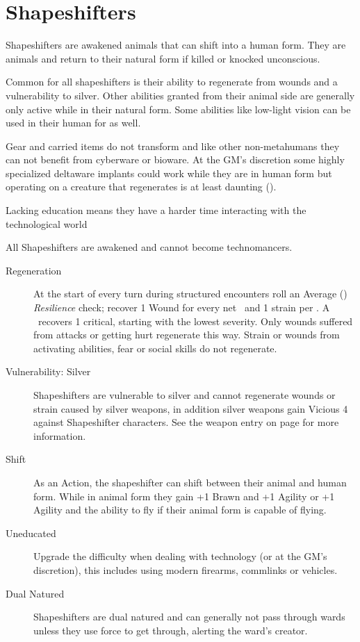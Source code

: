 \documentclass{book}
\begin{document}
\section{Shapeshifters}
\label{sec:shapeshifters}
\begin{multicols}{2}
Shapeshifters are awakened animals that can shift into a human form. They are animals and return to their natural form if killed or knocked unconscious. 

Common for all shapeshifters is their ability to regenerate from wounds and a vulnerability to silver. Other abilities granted from their animal side are generally only active while in their natural form. Some abilities like low-light vision can be used in their human for as well.

Gear and carried items do not transform and like other non-metahumans they can not benefit from cyberware or bioware. At the GM's discretion some highly specialized deltaware implants could work while they are in human form but operating on a creature that regenerates is at least daunting (\DifficultyDie \DifficultyDie \DifficultyDie \DifficultyDie).

Lacking education means they have a harder time interacting with the technological world

All Shapeshifters are awakened and cannot become technomancers.


\begin{description}
	\item[Regeneration] At the start of every turn during structured encounters roll an Average (\DifficultyDie \DifficultyDie) \emph{Resilience} check; recover 1 Wound for every net \Success\ and 1 strain per \Advantage. A \Triumph\ recovers 1 critical, starting with the lowest severity. Only wounds suffered from attacks or getting hurt regenerate this way. Strain or wounds from activating abilities, fear or social skills do not regenerate.
	\item[Vulnerability: Silver] Shapeshifters are vulnerable to silver and cannot regenerate wounds or strain caused by silver weapons, in addition silver weapons gain Vicious 4 against Shapeshifter characters. See the weapon entry on page \pageref{silver} for more information.
	\item[Shift] As an Action, the shapeshifter can shift between their animal and human form. While in animal form they gain +1 Brawn and +1 Agility or +1 Agility and the ability to fly if their animal form is capable of flying.
	\item[Uneducated] \label{uneducated} Upgrade the difficulty when dealing with technology (or at the GM's discretion), this includes using modern firearms, commlinks or vehicles.
	\item[Dual Natured] \label{dualnatured}  Shapeshifters are dual natured and can generally not pass through wards unless they use force to get through, alerting the ward's creator. 
\end{description}

\end{multicols}
\end{document}
